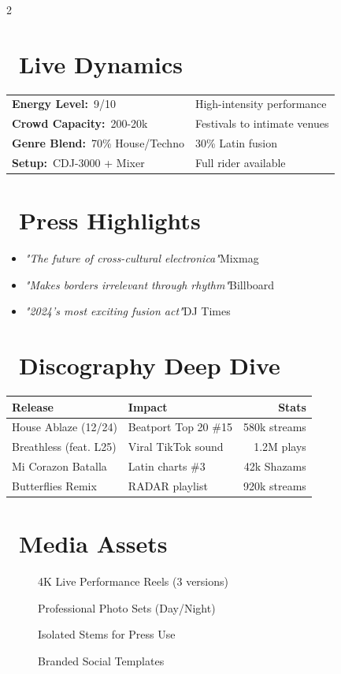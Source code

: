 \documentclass[11pt]{article}
\newcommand{\subtext}[1]{\textcolor{text!60}{\small#1}}
\newcommand{\stat}[2]{\textbf{\color{primary}#1}~\textcolor{text!80}{#2}}
\newcommand{\quoteitem}[2]{\item[\color{secondary}\tiny\faQuoteLeft] \textit{#1}\hfill\footnotesize\textcolor{text!60}{#2}}
\begin{document}
\begin{multicols}{2}
\columnbreak

\section*{\faMicrophone\ Live Dynamics}
\begin{tabularx}{\linewidth}{@{}lX@{}}
\stat{Energy Level:}{9/10} & \subtext{High-intensity performance} \\
\stat{Crowd Capacity:}{200-20k} & \subtext{Festivals to intimate venues} \\
\stat{Genre Blend:}{70\% House/Techno} & \subtext{30\% Latin fusion} \\
\stat{Setup:}{CDJ-3000 + Mixer} & \subtext{Full rider available} \\
\end{tabularx}

\section*{\faStar\ Press Highlights}
\begin{itemize}[leftmargin=*,itemsep=0.5em]
\quoteitem{"The future of cross-cultural electronica"}{Mixmag}
\quoteitem{"Makes borders irrelevant through rhythm"}{Billboard}
\quoteitem{"2024's most exciting fusion act"}{DJ Times}
\end{itemize}

\end{multicols}

\newpage

\section*{\faHeadphones\ Discography Deep Dive}
\begin{tabularx}{\textwidth}{@{}lXr@{}}
\textbf{Release} & \textbf{Impact} & \textbf{Stats} \\ \midrule
House Ablaze (12/24) & Beatport Top 20 \#15 & 580k streams \\
Breathless (feat. L25) & Viral TikTok sound & 1.2M plays \\
Mi Corazon Batalla & Latin charts \#3 & 42k Shazams \\
Butterflies Remix & RADAR playlist & 920k streams \\
\end{tabularx}

\section*{\faVideo\ Media Assets}
\begin{description}
\item[\faFilm] 4K Live Performance Reels (3 versions)
\item[\faPhotoVideo] Professional Photo Sets (Day/Night)
\item[\faFileAudio] Isolated Stems for Press Use
\item[\faHashtag] Branded Social Templates
\end{description}
\end{document}
